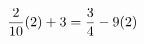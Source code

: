 \documentclass[preview]{standalone}
\begin{document}
\begin{align*}
\special{dvisvgm:raw <g id='unique000'>}\frac{2}{10}(2) + 3 = \frac{3}{4} - 9(2)\special{dvisvgm:raw </g>}
\end{align*}
\end{document}

